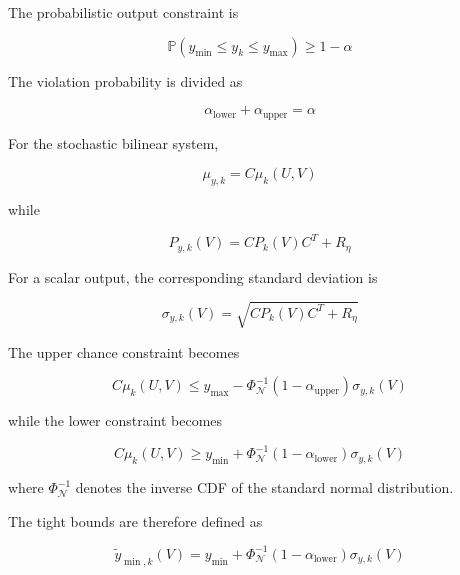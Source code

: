 The probabilistic output constraint is

\begin{equation}
    \mathbb{P}
    \left(
        y_{\min}
        \leq
        y_k
        \leq
        y_{\max}
    \right)
    \geq
    1-\alpha
\end{equation}

The violation probability is divided as

\begin{equation}
    \alpha_{\mathrm{lower}}
    +
    \alpha_{\mathrm{upper}}
    =
    \alpha
\end{equation}

For the stochastic bilinear system,

\begin{equation}
    \mu_{y,k}
    =
    C\mu_k(U,V)
\end{equation}

while

\begin{equation}
    P_{y,k}(V)
    =
    CP_k(V)C^T+R_\eta
\end{equation}

For a scalar output, the corresponding standard deviation is

\begin{equation}
    \sigma_{y,k}(V)
    =
    \sqrt{
        CP_k(V)C^T+R_\eta
    }
\end{equation}

The upper chance constraint becomes

\begin{equation}
    C\mu_k(U,V)
    \leq
    y_{\max}
    -
    \Phi_{\mathcal{N}}^{-1}
    \left(
        1-\alpha_{\mathrm{upper}}
    \right)
    \sigma_{y,k}(V)
\end{equation}

while the lower constraint becomes

\begin{equation}
    C\mu_k(U,V)
    \geq
    y_{\min}
    +
    \Phi_{\mathcal{N}}^{-1}
    \left(
        1-\alpha_{\mathrm{lower}}
    \right)
    \sigma_{y,k}(V)
\end{equation}

where \(\Phi_{\mathcal{N}}^{-1}\) denotes the inverse CDF of the
standard normal distribution.

The tight bounds are therefore defined as

\begin{equation}
    \boxed{
    \tilde{y}_{\min,k}(V)
    =
    y_{\min}
    +
    \Phi_{\mathcal{N}}^{-1}
    (1-\alpha_{\mathrm{lower}})
    \sigma_{y,k}(V)
    }
\end{equation}

